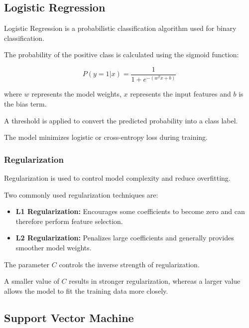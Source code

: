 \documentclass[12pt,a4paper]{article}
\begin{document}

\subsection{Logistic Regression}

Logistic Regression is a probabilistic classification algorithm used
for binary classification.

The probability of the positive class is calculated using the sigmoid
function:

\[
P(y=1|x) =
\frac{1}{1+e^{-(w^Tx+b)}}
\]

where $w$ represents the model weights, $x$ represents the input
features and $b$ is the bias term.

A threshold is applied to convert the predicted probability into a
class label.

The model minimizes logistic or cross-entropy loss during training.

\subsubsection{Regularization}

Regularization is used to control model complexity and reduce
overfitting.

Two commonly used regularization techniques are:

\begin{itemize}
    \item \textbf{L1 Regularization:} Encourages some coefficients to
    become zero and can therefore perform feature selection.
    
    \item \textbf{L2 Regularization:} Penalizes large coefficients and
    generally provides smoother model weights.
\end{itemize}

The parameter $C$ controls the inverse strength of regularization.

A smaller value of $C$ results in stronger regularization, whereas a
larger value allows the model to fit the training data more closely.


\subsection{Support Vector Machine}
\end{document}
